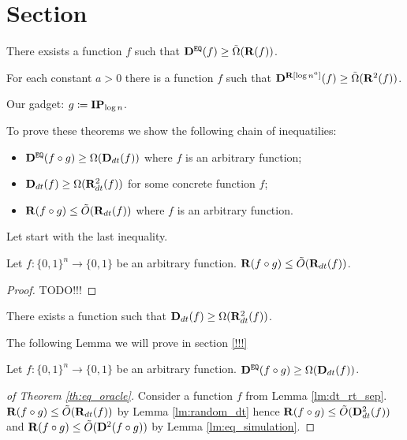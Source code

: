 \section{Section}

\begin{theorem}
    \label{th:eq_oracle}
    There exsists a function $f$ such that $\mathbf{D}^{\mathtt{EQ}}(f) \ge \tilde{\Omega}(\mathbf{R}(f))$.
\end{theorem}

\begin{theorem}
    For each constant $a > 0$ there is a function $f$ such that $\mathbf{D}^{\mathbf{R}[\log n^a]}(f) \ge
    \tilde{\Omega}(\mathbf{R}^2(f))$.
\end{theorem}

Our gadget: $g \coloneqq \mathbf{IP}_{\log n}$.

To prove these theorems we show the following chain of inequatilies:
\begin{itemize}
    \item $\mathbf{D}^{\mathtt{EQ}}(f \circ g) \ge \Omega(\mathbf{D}_{dt}(f))$ where $f$ is an arbitrary function;
    \item $\mathbf{D}_{dt}(f) \ge \Omega(\mathbf{R}_{dt}^2(f))$ for some concrete function $f$;
    \item $\mathbf{R}(f \circ g) \le \tilde{O}(\mathbf{R}_{dt}(f))$ where $f$ is an arbitrary function.
\end{itemize}



Let start with the last inequality.

\begin{lemma}
    \label{lm:random_dt}
    Let $f:\{0, 1\}^n \to \{0, 1\}$ be an arbitrary function. $\mathbf{R}(f \circ g) \le \tilde{O}(\mathbf{R}_{dt}(f))$.
\end{lemma}

\begin{proof}
    TODO!!!
\end{proof}

\begin{lemma}[\ref{!!!}]
    \label{lm:dt_rt_sep}
    There exists a function such that $\mathbf{D}_{dt}(f) \ge \Omega(\mathbf{R}_{dt}^2(f))$.
\end{lemma}


The following Lemma we will prove in section \ref{!!!}

\begin{lemma}
    \label{lm:eq_simulation}
    Let $f:\{0, 1\}^n \to \{0, 1\}$ be an arbitrary function. $\mathbf{D}^{\mathtt{EQ}}(f \circ g) \ge \Omega(\mathbf{D}_{dt}(f))$.
\end{lemma}



\begin{proof}[of Theorem \ref{th:eq_oracle}]
    Consider a function $f$ from Lemma \ref{lm:dt_rt_sep}. $\mathbf{R}(f \circ g) \le \tilde{O}(\mathbf{R}_{dt}(f))$ by
    Lemma \ref{lm:random_dt} hence $\mathbf{R}(f \circ g) \le \tilde{O}(\mathbf{D}^2_{dt}(f))$ and $\mathbf{R}(f \circ g) \le
    \tilde{O}(\mathbf{D}^2(f \circ g))$ by Lemma \ref{lm:eq_simulation}.
\end{proof}